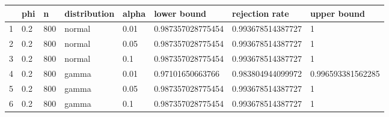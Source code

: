 \begin{table}[ht]
\centering
\begin{tabular}{rlllllll}
  \hline
 & phi & n & distribution & alpha & lower bound & rejection rate & upper bound \\ 
  \hline
1 & 0.2 & 800 & normal & 0.01 & 0.987357028775454 & 0.993678514387727 & 1 \\ 
  2 & 0.2 & 800 & normal & 0.05 & 0.987357028775454 & 0.993678514387727 & 1 \\ 
  3 & 0.2 & 800 & normal & 0.1 & 0.987357028775454 & 0.993678514387727 & 1 \\ 
  4 & 0.2 & 800 & gamma & 0.01 & 0.97101650663766 & 0.983804944099972 & 0.996593381562285 \\ 
  5 & 0.2 & 800 & gamma & 0.05 & 0.987357028775454 & 0.993678514387727 & 1 \\ 
  6 & 0.2 & 800 & gamma & 0.1 & 0.987357028775454 & 0.993678514387727 & 1 \\ 
   \hline
\end{tabular}
\end{table}


